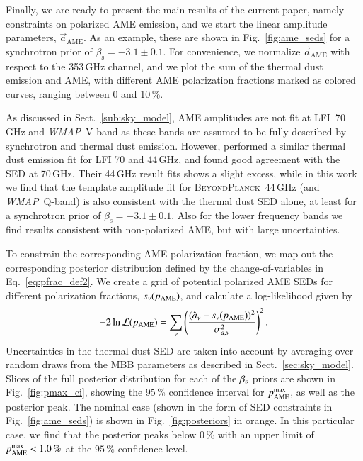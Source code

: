 \documentclass[twocolumn]{aa}
\def\WMAP{\textit{WMAP}}
\renewcommand{\a}[0]{\vec{a}}
\newcommand{\BP}{\textsc{BeyondPlanck}}
\newcommand{\lfi}[0]{LFI}
\begin{document}
Finally, we are ready to present the main results of the current
paper, namely constraints on polarized AME emission, and we start the
linear amplitude parameters, $\a_{\mathrm{AME}}$. As an example, these
are shown in Fig.~\ref{fig:ame_seds} for a synchrotron prior of
$\beta_{\mathrm{s}}=-3.1\pm0.1$. For convenience, we normalize
$\a_{\mathrm{AME}}$ with respect to the 353\,GHz channel, and we plot
the sum of the thermal dust emission and AME, with different AME
polarization fractions marked as colored curves, ranging between 0 and
10\,\%.

As discussed in Sect.~\ref{sub:sky_model}, AME amplitudes are not fit at
\lfi\ 70\,GHz and \WMAP\ V-band as these bands are assumed to be fully
described by synchrotron and thermal dust emission. However,
\citet{planck2016-l11A} performed a similar thermal dust emission fit
for LFI 70 and 44\,GHz, and found good agreement with the SED at
70\,GHz.  Their 44\,GHz result fits shows a slight excess, while in
this work we find that the template amplitude fit for \BP\ 44\,GHz
(and \WMAP\ Q-band) is also consistent with the thermal dust SED alone, at
least for a synchrotron prior of $\beta_{\mathrm{s}}=-3.1\pm0.1$. Also
for the lower frequency bands we find results consistent with
non-polarized AME, but with large uncertainties. 

To constrain the corresponding AME polarization fraction, we map out
the corresponding posterior distribution defined by the
change-of-variables in Eq.~\eqref{eq:pfrac_def2}. We create a grid of
potential polarized AME SEDs for different polarization fractions,
$s_{\nu}(p_{\rm AME})$, and calculate a log-likelihood given by
\begin{equation}
-2\ln\mathcal{L}(p_{\rm AME}) = \sum_{\nu} \left(\frac{(\hat{a}_{\nu}-s_{\nu}(p_{\rm AME}))^2}{\sigma_{a,\nu}^2}\right)^2.
\end{equation}
Uncertainties in the thermal dust SED are taken into account by
averaging over random draws from the MBB parameters as described in
Sect.~\ref{sec:sky_model}. Slices of the full posterior distribution for each of the $\beta_{\rm s}$ priors are shown in Fig.~\ref{fig:pmax_ci}, showing the 95\,\% confidence interval for $p_{\mathrm{AME}}^{\rm max}$, as well as the posterior peak. The nominal case (shown in the form of SED constraints in
Fig.~\ref{fig:ame_seds}) is shown in Fig.~\ref{fig:posteriors} in orange. In this particular case, we find that the
posterior peaks below 0\,\% with an upper limit of
$p_{\mathrm{AME}}^{\rm max} < 1.0\,\%$ at the $95\,\%$ confidence
level.
\end{document}
